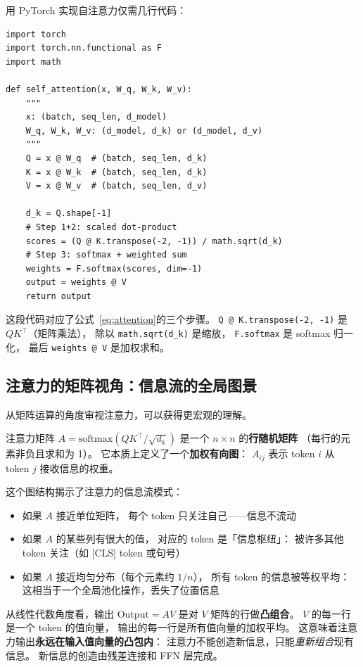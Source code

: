 用 PyTorch 实现自注意力仅需几行代码：

\begin{lstlisting}[caption={Self-Attention in PyTorch}]
import torch
import torch.nn.functional as F
import math

def self_attention(x, W_q, W_k, W_v):
    """
    x: (batch, seq_len, d_model)
    W_q, W_k, W_v: (d_model, d_k) or (d_model, d_v)
    """
    Q = x @ W_q  # (batch, seq_len, d_k)
    K = x @ W_k  # (batch, seq_len, d_k)
    V = x @ W_v  # (batch, seq_len, d_v)

    d_k = Q.shape[-1]
    # Step 1+2: scaled dot-product
    scores = (Q @ K.transpose(-2, -1)) / math.sqrt(d_k)
    # Step 3: softmax + weighted sum
    weights = F.softmax(scores, dim=-1)
    output = weights @ V
    return output
\end{lstlisting}

这段代码对应了公式~\eqref{eq:attention}的三个步骤。
\texttt{Q @ K.transpose(-2, -1)} 是 $QK^\top$（矩阵乘法），
除以 \texttt{math.sqrt(d\_k)} 是缩放，
\texttt{F.softmax} 是 softmax 归一化，
最后 \texttt{weights @ V} 是加权求和。

\subsection{注意力的矩阵视角：信息流的全局图景}

从矩阵运算的角度审视注意力，可以获得更宏观的理解。

注意力矩阵 $A = \mathrm{softmax}(QK^\top / \sqrt{d_k})$
是一个 $n \times n$ 的\textbf{行随机矩阵}
（每行的元素非负且求和为 1）。
它本质上定义了一个\textbf{加权有向图}：
$A_{ij}$ 表示 token $i$ 从 token $j$ 接收信息的权重。

这个图结构揭示了注意力的信息流模式：
\begin{itemize}[noitemsep]
  \item 如果 $A$ 接近单位矩阵，
        每个 token 只关注自己——信息不流动
  \item 如果 $A$ 的某些列有很大的值，
        对应的 token 是「信息枢纽」：
        被许多其他 token 关注（如 [CLS] token 或句号）
  \item 如果 $A$ 接近均匀分布（每个元素约 $1/n$），
        所有 token 的信息被等权平均：
        这相当于一个全局池化操作，丢失了位置信息
\end{itemize}

从线性代数角度看，输出 $\mathrm{Output} = AV$
是对 $V$ 矩阵的行做\textbf{凸组合}。
$V$ 的每一行是一个 token 的值向量，
输出的每一行是所有值向量的加权平均。
这意味着注意力输出\textbf{永远在输入值向量的凸包内}：
注意力不能创造新信息，只能\emph{重新组合}现有信息。
新信息的创造由残差连接和 FFN 层完成。

